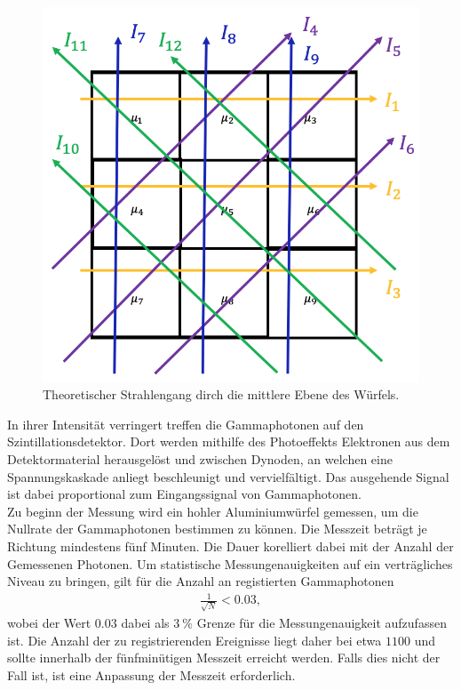 \begin{figure}
  \centering
  \includegraphics[scale=0.5]{ressources/strahlengang.png}
  \caption{Theoretischer Strahlengang dirch die mittlere Ebene des Würfels.}
  \label{fig:04}
\end{figure}
\FloatBarrier
\noindent In ihrer Intensität verringert treffen die Gammaphotonen auf den
Szintillationsdetektor. Dort werden mithilfe des Photoeffekts Elektronen
aus dem Detektormaterial herausgelöst und zwischen Dynoden, an welchen eine
Spannungskaskade anliegt beschleunigt und vervielfältigt. Das ausgehende Signal
ist dabei proportional zum Eingangssignal von Gammaphotonen. \\
\noindent Zu beginn der Messung wird ein hohler Aluminiumwürfel gemessen, um die
Nullrate der Gammaphotonen bestimmen zu können. Die Messzeit beträgt je Richtung
mindestens fünf Minuten. Die Dauer korelliert dabei mit der Anzahl der Gemessenen
Photonen. Um statistische Messungenauigkeiten auf ein verträgliches Niveau zu
bringen, gilt für die Anzahl an registierten Gammaphotonen
\begin{align}
  \frac{1}{\sqrt{N}} < \num{0.03},
\end{align}
\noindent wobei der Wert $\num{0.03}$ dabei als $\SI{3}{\percent}$ Grenze für
die Messungenauigkeit aufzufassen ist. Die Anzahl der zu registrierenden
Ereignisse liegt daher bei etwa $\num{1100}$ und sollte innerhalb der
fünfminütigen Messzeit erreicht werden. Falls dies nicht der Fall ist, ist eine
Anpassung der Messzeit erforderlich. \\

